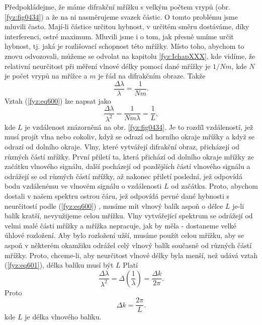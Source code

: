     Předpokládejme, že máme difrakční mřížku s velkým počtem vrypů (obr. \ref{fyz:fig0434}) a že na
    ni nasměrujeme svazek částic. O tomto problému jsme mluvili často. Mají-li částice určitou
    hybnost, v určitém směru dostáváme, díky interferenci, ostré maximum. Mluvili jsme i o tom, jak
    přesně umíme určit hybnost, tj. jaká je rozlišovací schopnost této mřížky. Místo toho, abychom
    to znovu odvozovali, můžeme se odvolat na kapitolu \ref {fyz:IchapXXX}, kde vidíme, že relativní
    neurčitost při měření vlnové délky pomocí dané mřížky je \(1/Nm\), kde \(N\) je počet vrypů na
    mřížce a \(m\) je řád na difrakčním obraze. Takže
    \begin{equation}\label{fyz:eq600}
      \frac{Δλ}{λ}=\frac{1}{Nm}.
    \end{equation}
    Vztah (\ref{fyz:eq600}) lze napsat jako
    \begin{equation}\label{fyz:eq601}
      \frac{Δλ}{λ^2} = \frac{1}{Nmλ} = \frac{1}{L},
    \end{equation} 
    kde \(L\) je vzdálenost znázorněná na obr. \ref{fyz:fig0434}. Je to rozdíl vzdáleností, jež musí
    projít vlna nebo cokoliv, když se odrazí od horního okraje mřížky a když se odrazí od dolního
    okraje. Vlny, které vytvářejí difrakční obraz, přicházejí od různých částí mřížky. První přiletí
    ta, která přichází od dolního okraje mřížky ze začátku vlnového signálu, další pocházejí od
    pozdějších částí vlnového signálu a odrážejí se od různých částí mřížky, až nakonec přiletí
    poslední, jež odpovídá bodu vzdálenému ve vlnovém signálu o vzdálenosti \(L\) od začátku. Proto,
    abychom dostali v našem spektru ostrou čáru, jež odpovídá pevné dané hybnosti s neurčitostí
    podle (\ref{fyz:eq600}) , musíme mít vlnový balík aspoň o délce \(L\) je-li balík kratší,
    nevyužijeme celou mřížku. Vlny vytvářející spektrum se odrážejí od velmi malé části mřížky a
    mřížka nepracuje, jak by měla - dostaneme velké úhlové rozložení. Aby bylo rozložení užší,
    musíme použít celou mřížku, aby se aspoň v některém okamžiku odrážel celý vlnový balík současně
    od různých částí mřížky. Proto, chceme-li, aby neurčitost vlnové délky byla menší, než udává
    vztah (\ref{fyz:eq601}), délka balíku musí být \(L\) Platí   
    \begin{equation*}
      \frac{Δλ}{λ^2} = Δ\left(\frac{1}{λ}\right)=\frac{Δk}{2π}.
    \end{equation*} 
    Proto
    \begin{equation}\label{fyz:eq602}
      Δk=\frac{2π}{L}.
    \end{equation} 
    kde \(L\) je délka vlnového balíku.

